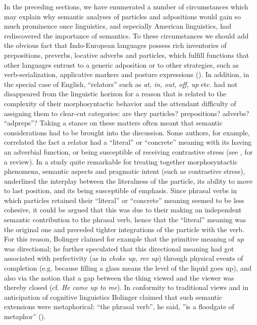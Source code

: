 \documentclass[english,output=paper,colorlinks,citecolor=brown]{../langscibook}
\begin{document}
In the preceding sections, we have enumerated a number of circumstances which may explain why semantic analyses of particles and adpositions would gain so much prominence once linguistics, and especially American linguistics, had rediscovered the importance of semantics. To these circumstances we should add the obvious fact that Indo-European languages possess rich inventories of prepositions, preverbs, locative adverbs and particles, which fulfill functions that other languages entrust to a generic adposition or to other strategies, such as verb-serialization, applicative markers and posture expressions (\citealt{FortisVittrant2016}). In addition, in the special case of English, “relators” such as \textit{at, in, out, off, up} etc. had not disappeared from the linguistic horizon for a reason that is related to the complexity of their morphosyntactic behavior and the attendant difficulty of assigning them to clear-cut categories: are they particles? prepositions? adverbs? “adpreps”? Taking a stance on these matters often meant that semantic considerations had to be brought into the discussion. Some authors, for example, correlated the fact a relator had a “literal” or “concrete” meaning with its having an adverbial function, or being susceptible of receiving contrastive stress (see \citealt{Lindner1981}, for a review). In a study quite remarkable for treating together morphosyntactic phenomena, semantic aspects and pragmatic intent (such as contrastive stress), \citet{Bolinger1971} underlined the interplay between the literalness of the particle, its ability to move to last position, and its being susceptible of emphasis. Since phrasal verbs in which particles retained their “literal” or “concrete” meaning seemed to be less cohesive, it could be argued that this was due to their making an independent semantic contribution to the phrasal verb, hence that the “literal” meaning was the original one and preceded tighter integrations of the particle with the verb. For this reason, Bolinger claimed for example that the primitive meaning of \textit{up} was directional; he further speculated that this directional meaning had got associated with perfectivity (as in \textit{choke up, rev up}) through physical events of completion (e.g. because filling a glass means the level of the liquid goes up), and also via the notion that a gap between the thing viewed and the viewer was thereby closed (cf. \textit{He came up to me}). In conformity to traditional views and in anticipation of cognitive linguistics Bolinger claimed that such semantic extensions were metaphorical: “the phrasal verb”, he said, ”is a floodgate of metaphor” (\citealt[xii]{Bolinger1971}).
\end{document}
